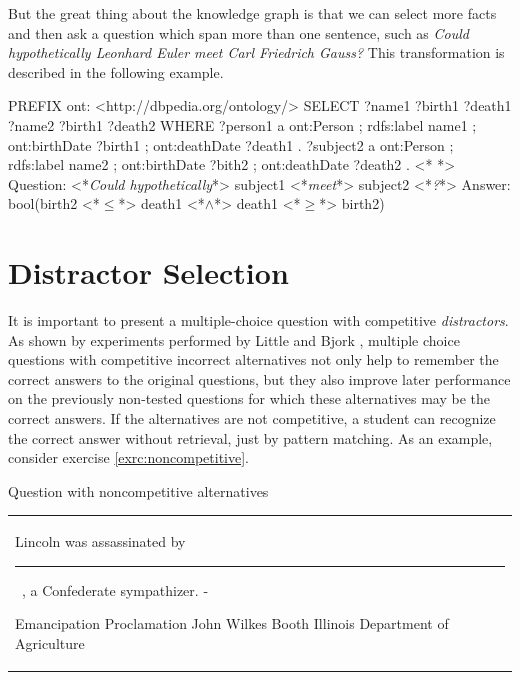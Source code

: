\documentclass[12pt, twoside]{fithesis2}
\renewcommand{\_}{\leavevmode \kern0.07em\vbox{\hrule width0.4em}}
\newcommand{\arrowlinesplit}{%
  \noindent\makebox[\linewidth]{\raisebox{0.15em}{\rule{0.478\textwidth}{0.5pt}}%
  ~$\downarrow$~%
  \noindent\raisebox{0.15em}{\rule{0.478\textwidth}{0.5pt}}}%
}
\newcounter{choice}
\renewcommand\thechoice{\Alph{choice}}
\newcommand\choicelabel{\thechoice.}
\newenvironment{choices}%
  {\vspace{0.8em}\list{\choicelabel}%
     {\usecounter{choice}\def\makelabel##1{\hss\llap{##1}}%
       \settowidth{\leftmargin}{W.\hskip\labelsep\hskip 0.01em}%
       \def\choice{%
         \item
       } %
       \labelwidth\leftmargin\advance\labelwidth-\labelsep
       \topsep=0pt
       \partopsep=0pt
     }%
  }%
  {\vspace{-0.7em}\endlist}
\newenvironment{question}
{
  \begin{center}
  \vspace{-0.5em}
  \begin{tabular}{p{0.9\textwidth}}
}
{
  \\
  \end{tabular}
  \vspace{-1em}
  \end{center}
}
\newcommand{\sentenceGap}{\rule{1.5cm}{0.4pt}~}
\begin{document}
\noindent
But the great thing about the knowledge graph is that we can select more facts and then ask a question which span more than one sentence, such as
\textit{Could hypothetically Leonhard Euler meet Carl Friedrich Gauss?}
This transformation is described in the following example.
\begin{code}
PREFIX ont: <http://dbpedia.org/ontology/>
SELECT ?name1 ?birth1 ?death1 ?name2 ?birth1 ?death2
WHERE {
  ?person1 a ont:Person ;
      rdfs:label name1 ;
      ont:birthDate ?birth1 ;
      ont:deathDate ?death1 .
  ?subject2 a ont:Person ;
      rdfs:label name2 ;
      ont:birthDate ?bith2 ;
      ont:deathDate ?death2 .
}
<*\arrowlinesplit*>
Question: <*\emph{Could hypothetically}*> subject1 <*\emph{meet}*> subject2 <*\emph{?}*>
Answer: bool(birth2 <*$\leq$*> death1 <*$\land$*> death1 <*$\geq$*> birth2)
\end{code}


\section{Distractor Selection}
\label{sec:distractors}

It is important to present a multiple-choice question with competitive \textit{distractors}.
As shown by experiments performed by Little and Bjork \cite{optimizing-multiple-choice}, multiple choice questions with competitive incorrect alternatives not only help to remember the correct answers to the original questions, but they also improve later performance on the previously non-tested questions for which these alternatives may be the correct answers. If the alternatives are not competitive, a student can recognize the correct answer without retrieval, just by pattern matching.
As an example, consider exercise \ref{exrc:noncompetitive}.
\begin{exercise}
\caption{Question with noncompetitive alternatives}\label{exrc:noncompetitive}
  \begin{question}
  Lincoln was assassinated by \sentenceGap , a Confederate sympathizer.
  \begin{choices}
    \choice Emancipation Proclamation
    \choice John Wilkes Booth
    \choice Illinois
    \choice Department of Agriculture
  \end{choices}
  \end{question}
\end{exercise}
\end{document}
